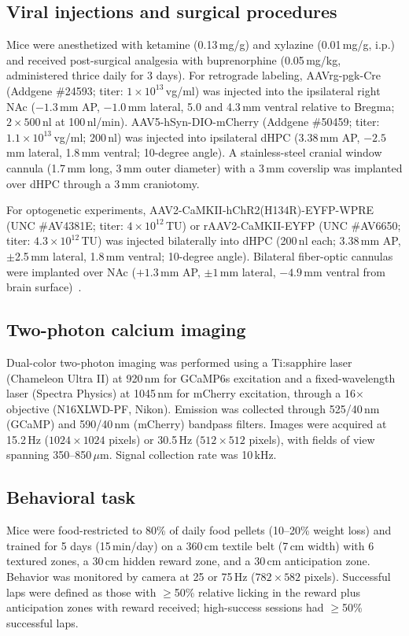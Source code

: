 \documentclass[11pt]{article}
\begin{document}
\subsection{Viral injections and surgical procedures}
Mice were anesthetized with ketamine (0.13\,mg/g) and xylazine (0.01\,mg/g, i.p.) and received post-surgical analgesia with buprenorphine (0.05\,mg/kg, administered thrice daily for 3 days). For retrograde labeling, AAVrg-pgk-Cre (Addgene \#24593; titer: $1 \times 10^{13}$\,vg/ml) was injected into the ipsilateral right NAc ($-1.3$\,mm AP, $-1.0$\,mm lateral, 5.0 and 4.3\,mm ventral relative to Bregma; $2 \times 500$\,nl at 100\,nl/min). AAV5-hSyn-DIO-mCherry (Addgene \#50459; titer: $1.1 \times 10^{13}$\,vg/ml; 200\,nl) was injected into ipsilateral dHPC (3.38\,mm AP, $-2.5$\,mm lateral, 1.8\,mm ventral; 10-degree angle). A stainless-steel cranial window cannula (1.7\,mm long, 3\,mm outer diameter) with a 3\,mm coverslip was implanted over dHPC through a 3\,mm craniotomy.

For optogenetic experiments, AAV2-CaMKII-hChR2(H134R)-EYFP-WPRE (UNC \#AV4381E; titer: $4 \times 10^{12}$\,TU) or rAAV2-CaMKII-EYFP (UNC \#AV6650; titer: $4.3 \times 10^{12}$\,TU) was injected bilaterally into dHPC (200\,nl each; 3.38\,mm AP, $\pm$2.5\,mm lateral, 1.8\,mm ventral; 10-degree angle). Bilateral fiber-optic cannulas were implanted over NAc ($+1.3$\,mm AP, $\pm 1$\,mm lateral, $-4.9$\,mm ventral from brain surface)~\citep{boyden2005}.

\subsection{Two-photon calcium imaging}
Dual-color two-photon imaging was performed using a Ti:sapphire laser (Chameleon Ultra II) at 920\,nm for GCaMP6s excitation and a fixed-wavelength laser (Spectra Physics) at 1045\,nm for mCherry excitation, through a 16$\times$ objective (N16XLWD-PF, Nikon). Emission was collected through 525/40\,nm (GCaMP) and 590/40\,nm (mCherry) bandpass filters. Images were acquired at 15.2\,Hz ($1024 \times 1024$ pixels) or 30.5\,Hz ($512 \times 512$ pixels), with fields of view spanning 350--850\,$\mu$m. Signal collection rate was 10\,kHz.

\subsection{Behavioral task}
Mice were food-restricted to 80\% of daily food pellets (10--20\% weight loss) and trained for 5 days (15\,min/day) on a 360\,cm textile belt (7\,cm width) with 6 textured zones, a 30\,cm hidden reward zone, and a 30\,cm anticipation zone. Behavior was monitored by camera at 25 or 75\,Hz ($782 \times 582$ pixels). Successful laps were defined as those with $\geq$50\% relative licking in the reward plus anticipation zones with reward received; high-success sessions had $\geq$50\% successful laps.
\end{document}
